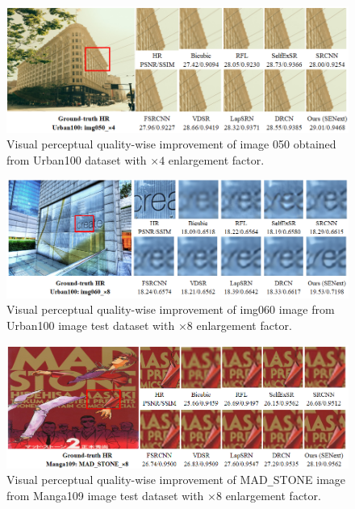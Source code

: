 \documentclass{ieeeaccess}
\begin{document}
\begin{figure}
    \centering

    \includegraphics[width=\linewidth]{15Figure.png}
    \caption{Visual perceptual quality-wise improvement of image 050 obtained from Urban100 dataset with $\times4$ enlargement factor.}
    \label{fig:15}
\end{figure}


\begin{figure}
    \centering

    \includegraphics[width=\linewidth]{16Figure.png}
    \caption{Visual perceptual quality-wise improvement of img060 image from Urban100 image test dataset with $\times8$ enlargement factor.}
    \label{fig:16}
\end{figure}


\begin{figure}
    \centering

    \includegraphics[width=\linewidth]{17Figure.png}
    \caption{Visual perceptual quality-wise improvement of MAD\texttt{\_}STONE image from Manga109 image test dataset with $\times8$ enlargement factor.}
    \label{fig:16}
\end{figure}
\end{document}
